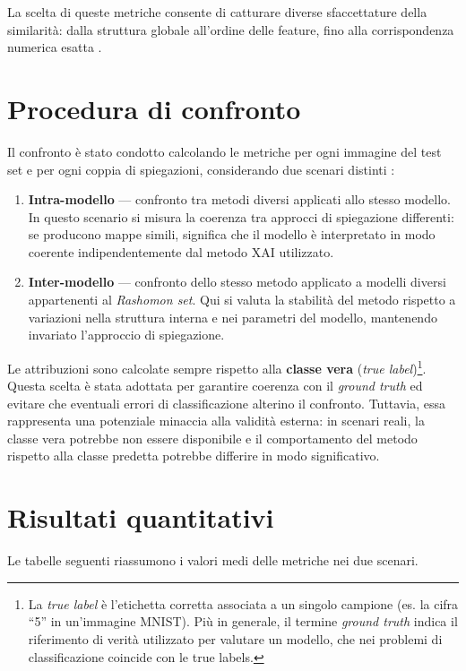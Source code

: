 \documentclass[12pt,a4paper,oneside]{report}
\numberwithin{figure}{chapter}
\numberwithin{table}{chapter}
\begin{document}
La scelta di queste metriche consente di catturare diverse sfaccettature della
similarità: dalla struttura globale all’ordine delle feature, fino alla
corrispondenza numerica esatta \citep{leventi2023consistency,
      samek2016evaluating}.

\section{Procedura di confronto}
Il confronto è stato condotto calcolando le metriche per ogni immagine del test
set e per ogni coppia di spiegazioni, considerando due scenari distinti
\citep{bhatt2021evaluating, mueller2023rashomon, leventi2023consistency,
      krishna2022disagreement}:

\begin{enumerate}
      \item \textbf{Intra-modello} — confronto tra metodi diversi applicati allo stesso modello.
            In questo scenario si misura la coerenza tra approcci di spiegazione differenti:
            se producono mappe simili, significa che il modello è interpretato in modo coerente
            indipendentemente dal metodo XAI utilizzato.

      \item \textbf{Inter-modello} — confronto dello stesso metodo applicato a modelli diversi
            appartenenti al \emph{Rashomon set}.
            Qui si valuta la stabilità del metodo rispetto a variazioni nella struttura interna
            e nei parametri del modello, mantenendo invariato l’approccio di spiegazione.
\end{enumerate}

Le attribuzioni sono calcolate sempre rispetto alla \textbf{classe vera}
(\textit{true label})\footnote{La \emph{true label} è l’etichetta corretta
      associata a un singolo campione (es. la cifra “5” in un’immagine MNIST). Più in
      generale, il termine \emph{ground truth} indica il riferimento di verità
      utilizzato per valutare un modello, che nei problemi di classificazione
      coincide con le true labels.}. Questa scelta è stata adottata per garantire
coerenza con il \emph{ground truth} ed evitare che eventuali errori di
classificazione alterino il confronto. Tuttavia, essa rappresenta una
potenziale minaccia alla validità esterna: in scenari reali, la classe vera
potrebbe non essere disponibile e il comportamento del metodo rispetto alla
classe predetta potrebbe differire in modo significativo.

\section{Risultati quantitativi}
Le tabelle seguenti riassumono i valori medi delle metriche nei due scenari.
\end{document}

